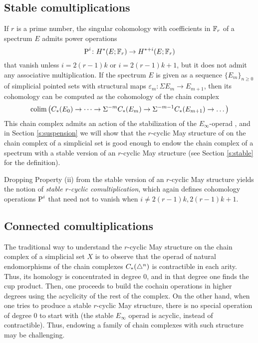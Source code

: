 \subsection{Stable comultiplications}

If $r$ is a prime number, the singular cohomology with coefficients in $\mathbb{F}_r$ of a spectrum $E$ admits power operations
\[
\operatorname{P}^i \colon  H^*(E;\mathbb{F}_r)\to H^{*+i}(E;\mathbb{F}_r)
\]
that vanish unless $i = 2(r-1)k$ or $i = 2(r-1)k+1$, but it does not admit any associative multiplication.
If the spectrum $E$ is given as a sequence $\{E_m\}_{n\geq 0}$ of simplicial pointed sets with structural maps $\varepsilon_m \colon  \Sigma E_m\to E_{m+1}$, then its cohomology can be computed as the cohomology of the chain complex
\[
\operatorname*{colim} \left(C_{*}(E_0)\to \dots \to \Sigma^{-m}C_{*}(E_m)\to \Sigma^{-m-1} C_{*}(E_{m+1})\to \dots\right)
\]
This chain complex admits an action of the stabilization of the $E_{\infty}$-operad \cite{Gill2020}, and in Section \ref{s:suspension} we will show that the $r$-cyclic May structure of \cite{medina2021may_st} on the chain complex of a simplicial set is good enough to endow the chain complex of a spectrum with a stable version of an $r$-cyclic May structure (see Section \ref{s:stable} for the definition).

Dropping Property (ii) from the stable version of an $r$-cyclic May structure yields the notion of \emph{stable $r$-cyclic comultiplication}, which again defines cohomology operations $\operatorname{P}^i$ that need not to vanish when $i \neq 2(r-1)k, 2(r-1)k+1$.

\subsection{Connected comultiplications}

The traditional way to understand the $r$-cyclic May structure on the chain complex of a simplicial set $X$ is to observe that the operad of natural endomorphisms of the chain complexes $C_{*}(\triangle^n)$ is contractible in each arity.
Thus, its homology is concentrated in degree $0$, and in that degree one finds the cup product.
Then, one proceeds to build the cochain operations in higher degrees using the acyclicity of the rest of the complex.
On the other hand, when one tries to produce a stable $r$-cyclic May structure, there is no special operation of degree $0$ to start with (the stable $E_{\infty}$ operad is acyclic, instead of contractible).
Thus, endowing a family of chain complexes with such structure may be challenging.


